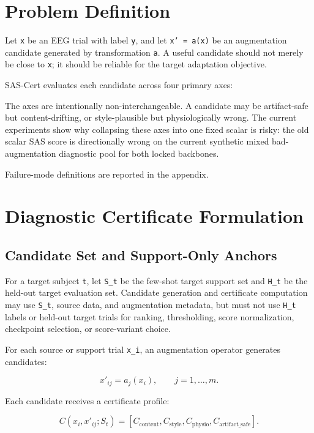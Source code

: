 \documentclass[11pt]{article}
\begin{document}
\section{Problem Definition}

Let \texttt{x} be an EEG trial with label \texttt{y}, and let \texttt{x' = a(x)} be an augmentation candidate generated by transformation \texttt{a}. A useful candidate should not merely be close to \texttt{x}; it should be reliable for the target adaptation objective.

SAS-Cert evaluates each candidate across four primary axes:



The axes are intentionally non-interchangeable. A candidate may be artifact-safe but content-drifting, or style-plausible but physiologically wrong. The current experiments show why collapsing these axes into one fixed scalar is risky: the old scalar SAS score is directionally wrong on the current synthetic mixed bad-augmentation diagnostic pool for both locked backbones.

Failure-mode definitions are reported in the appendix.

\section{Diagnostic Certificate Formulation}

\subsection{Candidate Set and Support-Only Anchors}

For a target subject \texttt{t}, let \texttt{S\_t} be the few-shot target support set and \texttt{H\_t} be the held-out target evaluation set. Candidate generation and certificate computation may use \texttt{S\_t}, source data, and augmentation metadata, but must not use \texttt{H\_t} labels or held-out target trials for ranking, thresholding, score normalization, checkpoint selection, or score-variant choice.

For each source or support trial \texttt{x\_i}, an augmentation operator generates candidates:

\[
x'_{ij} = a_j(x_i), \qquad j = 1,\ldots,m .
\]

Each candidate receives a certificate profile:

\[
C(x_i, x'_{ij}; S_t)=
\left[C_{\mathrm{content}}, C_{\mathrm{style}},
C_{\mathrm{physio}}, C_{\mathrm{artifact\_safe}}\right].
\]
\end{document}
